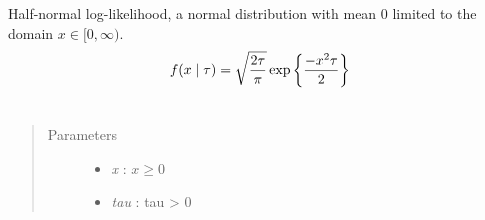 \documentclass[letterpaper,10pt,english]{sphinxmanual}
\begin{document}
\begin{fulllineitems}
\label{distributions:pymc.distributions.half_normal_like}
Half-normal log-likelihood, a normal distribution with mean 0 limited
to the domain $x \in [0, \infty)$.
\begin{gather}
\begin{split}f(x \mid \tau) = \sqrt{\frac{2\tau}{\pi}}\exp\left\{ {\frac{-x^2 \tau}{2}}\right\}\end{split}\notag\\\begin{split}\end{split}\notag
\end{gather}\begin{quote}\begin{description}
\item[{Parameters }] \leavevmode\begin{itemize}
\item {} 
\emph{x} : $x \ge 0$

\item {} 
\emph{tau} : tau \textgreater{} 0

\end{itemize}

\end{description}\end{quote}

\end{fulllineitems}

\end{document}
